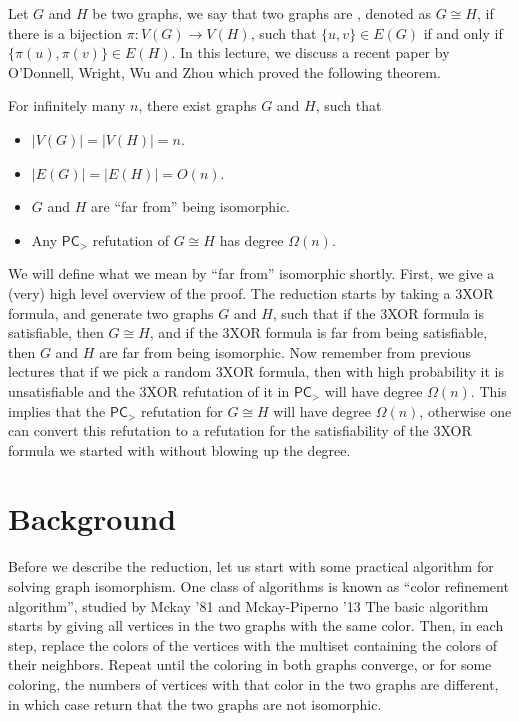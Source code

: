 \documentclass[a4paper,twoside,justified]{tufte-handout}
\begin{document}
 


Let $G$ and $H$ be two graphs, we say that two graphs are ,
denoted as $G \cong H$,
if there is a bijection $\pi: V(G) \to V(H)$, such that $\{u,v\} \in E(G)$
if and only if $\{\pi(u),\pi(v)\} \in E(H)$. In this lecture, we discuss
a recent paper by O'Donnell, Wright, Wu and Zhou \cite{} which proved the following
theorem.

\begin{theorem}\label{thm:main}
  For infinitely many $n$, there exist graphs $G$ and $H$, such that
  \begin{itemize}
    \item $|V(G)|=|V(H)|=n$.
    \item $|E(G)|=|E(H)|=O(n)$.
    \item $G$ and $H$ are ``far from'' being isomorphic.
    \item Any $\mathsf{PC}_{>}$ refutation of $G \cong H$ has degree $\Omega(n)$.
  \end{itemize}
\end{theorem}

We will define what we mean by ``far from'' isomorphic shortly. First, we give a (very) high level
overview of the proof. The reduction starts by taking a 3XOR formula, and generate two graphs $G$ and $H$, such
that if the 3XOR formula is satisfiable, then $G \cong H$, and if the 3XOR formula is far from being satisfiable,
then $G$ and $H$ are far from being isomorphic. Now remember from previous lectures that if we pick a random 3XOR formula,
then with high probability it is unsatisfiable and the 3XOR refutation of it in $\mathsf{PC}_{>}$ will have degree $\Omega(n)$.
This implies that the $\mathsf{PC}_{>}$ refutation for $G \cong H$ will have degree $\Omega(n)$, otherwise one
can convert this refutation to a refutation for the satisfiability of the 3XOR formula we started with without blowing up the degree.

\section{Background}
Before we describe the reduction, let us start with some practical algorithm for solving graph isomorphism. 
One class of algorithms is known as ``color refinement algorithm'', studied by Mckay '81 and Mckay-Piperno '13 \cite{}
The basic algorithm starts by giving all vertices in the two graphs with the same color. 
Then, in each step, replace the colors of the vertices with the multiset containing the colors of their neighbors.
Repeat until the coloring in both graphs converge, or for some coloring, the numbers of vertices with that color
in the two graphs are different, in which case return that the two graphs are not isomorphic.
\end{document}
